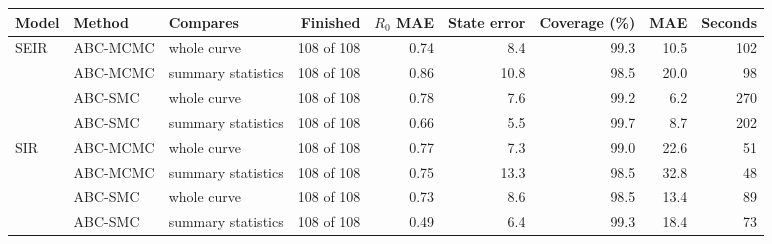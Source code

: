 \begin{tabular}{lllrrrrrr}
\toprule
Model & Method & Compares & Finished & $R_0$ MAE & State error & Coverage (\%) & MAE & Seconds \\
\midrule
SEIR & ABC-MCMC & whole curve & 108 of 108 & 0.74 & 8.4 & 99.3 & 10.5 & 102 \\
 & ABC-MCMC & summary statistics & 108 of 108 & 0.86 & 10.8 & 98.5 & 20.0 & 98 \\
 & ABC-SMC & whole curve & 108 of 108 & 0.78 & 7.6 & 99.2 & 6.2 & 270 \\
 & ABC-SMC & summary statistics & 108 of 108 & 0.66 & 5.5 & 99.7 & 8.7 & 202 \\
\midrule
SIR & ABC-MCMC & whole curve & 108 of 108 & 0.77 & 7.3 & 99.0 & 22.6 & 51 \\
 & ABC-MCMC & summary statistics & 108 of 108 & 0.75 & 13.3 & 98.5 & 32.8 & 48 \\
 & ABC-SMC & whole curve & 108 of 108 & 0.73 & 8.6 & 98.5 & 13.4 & 89 \\
 & ABC-SMC & summary statistics & 108 of 108 & 0.49 & 6.4 & 99.3 & 18.4 & 73 \\
\bottomrule
\end{tabular}

